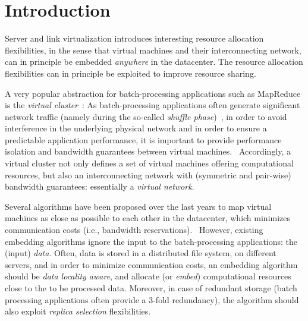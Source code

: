 \documentclass[9pt]{sigcomm-alternate}
\begin{document}
\section{Introduction}


Server and link virtualization introduces interesting resource allocation flexibilities,
in the sense that virtual machines and their interconnecting network,
can in principle be embedded \emph{anywhere} in the datacenter.
The resource allocation flexibilities
can in principle be exploited to improve resource sharing.

A very popular abstraction for batch-processing applications such as MapReduce is the \emph{virtual cluster}~\cite{oktopus}:
As batch-processing applications often generate significant
network traffic (namely during the so-called \emph{shuffle phase})~\cite{amazonbw},
in order to avoid interference in the underlying physical network and in order to ensure a predictable
application performance,
it is important to provide performance isolation and bandwidth guarantees between virtual machines.~\cite{talk-about}
Accordingly, a virtual cluster not only defines a set of virtual machines offering computational resources,
but also an interconnecting network with (symmetric and pair-wise) bandwidth guarantees: essentially a \emph{virtual network}.

Several algorithms have been proposed over the last years to map virtual machines as close as possible
to each other in the datacenter, which minimizes communication costs (i.e., bandwidth reservations).~\cite{oktopus,proteus}
However, existing embedding algorithms ignore the input to the batch-processing applications:
the (input) \emph{data}. Often, data is stored in a distributed file system, on different servers,
and in order to minimize
communication costs, an embedding algorithm should be \emph{data locality aware},
and allocate (or \emph{embed}) computational resources close to the to be processed data. Moreover, in case of redundant storage (batch processing
applications often provide a 3-fold redundancy), the algorithm should also exploit \emph{replica selection}
flexibilities.
\end{document}
